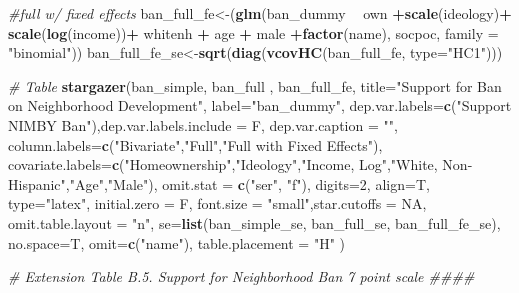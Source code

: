 \documentclass[]{article}
\newenvironment{Shaded}{\begin{snugshade}}{\end{snugshade}}
\newcommand{\CommentTok}[1]{\textcolor[rgb]{0.56,0.35,0.01}{\textit{#1}}}
\newcommand{\DataTypeTok}[1]{\textcolor[rgb]{0.13,0.29,0.53}{#1}}
\newcommand{\DecValTok}[1]{\textcolor[rgb]{0.00,0.00,0.81}{#1}}
\newcommand{\KeywordTok}[1]{\textcolor[rgb]{0.13,0.29,0.53}{\textbf{#1}}}
\newcommand{\NormalTok}[1]{#1}
\newcommand{\OperatorTok}[1]{\textcolor[rgb]{0.81,0.36,0.00}{\textbf{#1}}}
\newcommand{\OtherTok}[1]{\textcolor[rgb]{0.56,0.35,0.01}{#1}}
\newcommand{\StringTok}[1]{\textcolor[rgb]{0.31,0.60,0.02}{#1}}
\begin{document}
\begin{Shaded}
\begin{Highlighting}[]
{\CommentTok{#full w/ fixed effects}
\NormalTok{ban_full_fe<-(}\KeywordTok{glm}\NormalTok{(ban_dummy }\OperatorTok{~}\StringTok{  }\NormalTok{own }\OperatorTok{+}\KeywordTok{scale}\NormalTok{(ideology)}\OperatorTok{+}\StringTok{ }\KeywordTok{scale}\NormalTok{(}\KeywordTok{log}\NormalTok{(income))}\OperatorTok{+}\StringTok{ }\NormalTok{whitenh  }\OperatorTok{+}\StringTok{ }\NormalTok{age }\OperatorTok{+}\StringTok{ }\NormalTok{male }\OperatorTok{+}\KeywordTok{factor}\NormalTok{(name), socpoc, }\DataTypeTok{family =} \StringTok{"binomial"}\NormalTok{))}
\NormalTok{ban_full_fe_se<-}\KeywordTok{sqrt}\NormalTok{(}\KeywordTok{diag}\NormalTok{(}\KeywordTok{vcovHC}\NormalTok{(ban_full_fe, }\DataTypeTok{type=}\StringTok{"HC1"}\NormalTok{)))}

\CommentTok{# Table}
\KeywordTok{stargazer}\NormalTok{(ban_simple,  ban_full , ban_full_fe, }\DataTypeTok{title=}\StringTok{"Support for Ban on Neighborhood Development"}\NormalTok{, }\DataTypeTok{label=}\StringTok{"ban_dummy"}\NormalTok{,}
          \DataTypeTok{dep.var.labels=}\KeywordTok{c}\NormalTok{(}\StringTok{"Support NIMBY Ban"}\NormalTok{),}\DataTypeTok{dep.var.labels.include =}\NormalTok{ F, }\DataTypeTok{dep.var.caption =} \StringTok{""}\NormalTok{,}
          \DataTypeTok{column.labels=}\KeywordTok{c}\NormalTok{(}\StringTok{"Bivariate"}\NormalTok{,}\StringTok{"Full"}\NormalTok{,}\StringTok{"Full with Fixed Effects"}\NormalTok{),}
          \DataTypeTok{covariate.labels=}\KeywordTok{c}\NormalTok{(}\StringTok{"Homeownership"}\NormalTok{,}\StringTok{"Ideology"}\NormalTok{,}\StringTok{"Income, Log"}\NormalTok{,}\StringTok{"White, Non-Hispanic"}\NormalTok{,}\StringTok{"Age"}\NormalTok{,}\StringTok{"Male"}\NormalTok{),}
          \DataTypeTok{omit.stat =} \KeywordTok{c}\NormalTok{(}\StringTok{"ser"}\NormalTok{, }\StringTok{"f"}\NormalTok{), }\DataTypeTok{digits=}\DecValTok{2}\NormalTok{, }\DataTypeTok{align=}\NormalTok{T, }\DataTypeTok{type=}\StringTok{"latex"}\NormalTok{,}
          \DataTypeTok{initial.zero =}\NormalTok{ F,  }\DataTypeTok{font.size =} \StringTok{"small"}\NormalTok{,}\DataTypeTok{star.cutoffs =} \OtherTok{NA}\NormalTok{, }\DataTypeTok{omit.table.layout =} \StringTok{"n"}\NormalTok{,}
          \DataTypeTok{se=}\KeywordTok{list}\NormalTok{(ban_simple_se, ban_full_se, ban_full_fe_se), }\DataTypeTok{no.space=}\NormalTok{T, }\DataTypeTok{omit=}\KeywordTok{c}\NormalTok{(}\StringTok{"name"}\NormalTok{), }\DataTypeTok{table.placement =} \StringTok{"H"}\NormalTok{ )}


\CommentTok{# Extension Table B.5. Support for Neighborhood Ban 7 point scale ####}

}
\end{Highlighting}
\end{Shaded}
\end{document}
